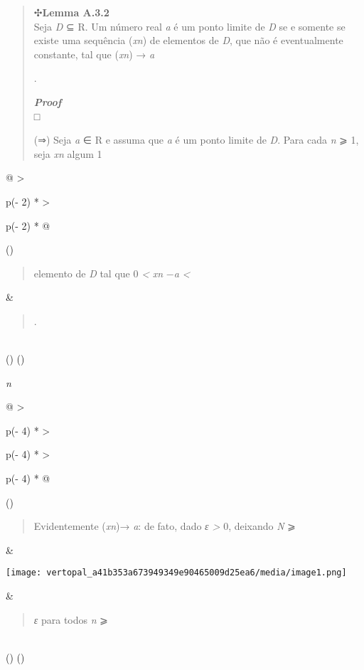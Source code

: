 \documentclass[
]{article}
\begin{document}
\begin{quote}
✣\textbf{Lemma A.3.2}\\
Seja \emph{D} ⊆ R. Um número real \emph{a} é um ponto limite de \emph{D}
se e somente se existe uma sequência (\emph{xn}) de elementos de
\emph{D}, que não é eventualmente constante, tal que (\emph{xn}) →
\emph{a}

.

\emph{\textbf{Proof}}\\
□

(⇒) Seja \emph{a} ∈ R e assuma que \emph{a} é um ponto limite de
\emph{D}. Para cada \emph{n} ⩾ 1, seja \emph{xn} algum 1
\end{quote}

\begin{longtable}[]{@{}
  >{\raggedright\arraybackslash}p{(\columnwidth - 2\tabcolsep) * }
  >{\raggedright\arraybackslash}p{(\columnwidth - 2\tabcolsep) * }@{}}
\toprule()
\begin{minipage}[b]{\linewidth}\raggedright
\begin{quote}
elemento de \emph{D} tal que 0 \emph{\textless{}} \textbar{}\emph{xn}
−\emph{a}\textbar{} \emph{\textless{}}
\end{quote}
\end{minipage} & \begin{minipage}[b]{\linewidth}\raggedright
\begin{quote}
.
\end{quote}
\end{minipage} \\
\midrule()
\endhead
\bottomrule()
\end{longtable}

\emph{n}

\begin{longtable}[]{@{}
  >{\raggedright\arraybackslash}p{(\columnwidth - 4\tabcolsep) * }
  >{\raggedright\arraybackslash}p{(\columnwidth - 4\tabcolsep) * }
  >{\raggedright\arraybackslash}p{(\columnwidth - 4\tabcolsep) * }@{}}
\toprule()
\begin{minipage}[b]{\linewidth}\raggedright
\begin{quote}
Evidentemente (\emph{xn})→ \emph{a}: de fato, dado \emph{ε
\textgreater{}} 0, deixando \emph{N} ⩾
\end{quote}
\end{minipage} & \begin{minipage}[b]{\linewidth}\raggedright
\texttt{[image: vertopal\_a41b353a673949349e90465009d25ea6/media/image1.png]}
\end{minipage} & \begin{minipage}[b]{\linewidth}\raggedright
\begin{quote}
\emph{ε} para todos \emph{n} ⩾
\end{quote}
\end{minipage} \\
\midrule()
\endhead
\bottomrule()
\end{longtable}
\end{document}
